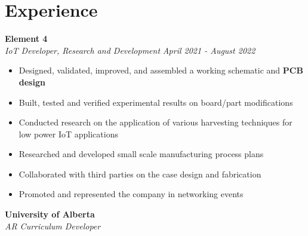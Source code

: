 \documentclass[a4paper,20pt]{article}
\begin{document}
\section{Experience}
    \vspace{-1pt}
        \textbf{Element 4}\hspace{13.5 cm}
        \textit{}\\
        \textit{IoT Developer, Research and Development} \hspace{7.8 cm}
        \textit{April 2021 - August 2022} \\
        \vspace{-18pt} 
        \hspace{-1pt}

    \begin{itemize}
        \item Designed, validated, improved, and assembled a working schematic and \textbf{PCB design} \vspace{-5pt}
        \item Built, tested and verified experimental results on board/part modifications  \vspace{-5pt}
        \item Conducted research on the application of various harvesting techniques for low power IoT applications \vspace{-5pt}
        \item Researched and developed small scale manufacturing process plans \vspace{-5pt}
        \item Collaborated with third parties on the case design and fabrication \vspace{-5pt}
        \item Promoted and represented the company in networking events 
        
    \end{itemize}
    \vspace{-1pt}
        \textbf{University of Alberta}\hspace{3cm}
        \textit{}\\
        \textit{AR Curriculum Developer}\hspace{10.05 cm}
\end{document}
